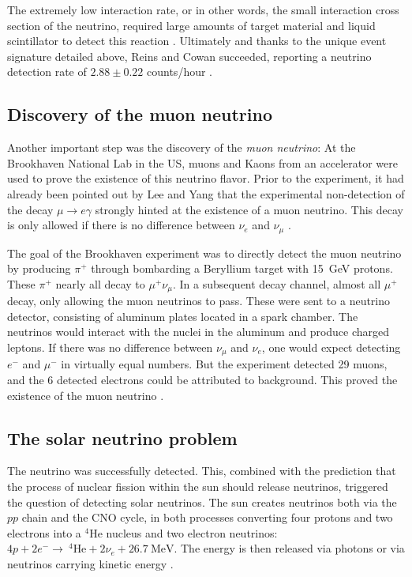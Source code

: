 \documentclass[
    a4paper, %
    fontsize=10pt, %
    twoside=false, %
    numbers=noenddot, %
    fontmethod=tex,
]{kaobook}
\begin{document}
The extremely low interaction rate, or in other words, the small interaction cross section of the neutrino, required large amounts of target material and liquid scintillator to detect this reaction \cite{Giunti2007}. Ultimately and thanks to the unique event signature detailed above, Reins and Cowan succeeded, reporting a neutrino detection rate of $2.88 \pm 0.22$ counts/hour \cite{Reines1956}.

\subsection{Discovery of the muon neutrino}
Another important step was the discovery of the \textit{muon neutrino}: At the Brookhaven National Lab in the US, muons and Kaons from an accelerator were used to prove the existence of this neutrino flavor. Prior to the experiment, it had already been pointed out by Lee and Yang that the experimental non-detection of the decay $\mu \rightarrow e \gamma$ strongly hinted at the existence of a muon neutrino. This decay is only allowed if there is no difference between $\nu_e$ and $\nu_\mu$ .

The goal of the Brookhaven experiment was to directly detect the muon neutrino by producing $\pi^+$ through bombarding a Beryllium target with \SI{15}{\giga\eV} protons. These $\pi^+$ nearly all decay to $\mu^+ \nu_\mu$. In a subsequent decay channel, almost all $\mu^+$ decay, only allowing the muon neutrinos to pass. These were sent to a neutrino detector, consisting of aluminum plates located in a spark chamber. The neutrinos would interact with the nuclei in the aluminum and produce charged leptons. If there was no difference between $\nu_\mu$ and $\nu_e$, one would expect detecting $e^-$ and $\mu^-$ in virtually equal numbers. But the experiment detected 29 muons, and the 6 detected electrons could be attributed to background. This proved the existence of the muon neutrino .


\subsection{The solar neutrino problem}

The neutrino was successfully detected. This, combined with the prediction that the process of nuclear fission within the sun should release neutrinos, triggered the question of detecting solar neutrinos. The sun creates neutrinos both via the $pp$ chain and the CNO cycle, in both processes converting four protons and two electrons into a $^4\text{He}$ nucleus and two electron neutrinos: $4p + 2e^- \rightarrow  ~^4\text{He} + 2\nu_e + \SI{26.7}{\mega\eV}$. The energy is then released via photons or via neutrinos carrying kinetic energy \cite{Giunti2007}.
\end{document}
